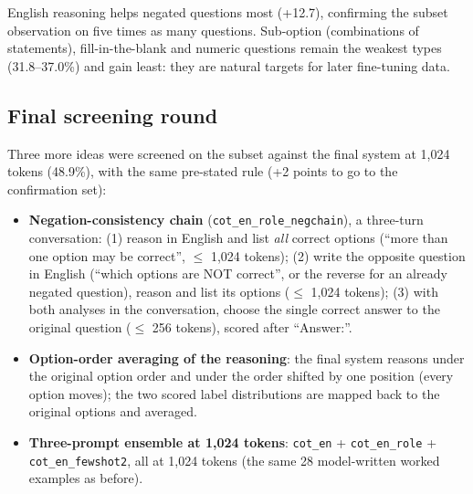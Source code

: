 \documentclass[10pt,a4paper]{article}
\newcommand{\cond}[1]{\texttt{#1}}
\begin{document}
English reasoning helps negated questions most (+12.7), confirming the subset observation on five times as many
questions. Sub-option (combinations of statements), fill-in-the-blank and numeric questions remain the weakest types
(31.8--37.0\%) and gain least: they are natural targets for later fine-tuning data.

\subsection{Final screening round}\label{sec:final_round}
Three more ideas were screened on the subset against the final system at 1,024 tokens (48.9\%), with the same
pre-stated rule (+2 points to go to the confirmation set):
\begin{itemize}
\item \textbf{Negation-consistency chain} (\cond{cot\_en\_role\_negchain}), a three-turn conversation: (1) reason in
English and list \emph{all} correct options (``more than one option may be correct'', $\le$ 1,024 tokens);
(2) write the opposite question in English (``which options are NOT correct'', or the reverse for an already negated
question), reason and list its options ($\le$ 1,024 tokens); (3) with both analyses in the conversation, choose the
single correct answer to the original question ($\le$ 256 tokens), scored after ``Answer:\textvisiblespace''.
\item \textbf{Option-order averaging of the reasoning}: the final system reasons under the original option order and
under the order shifted by one position (every option moves); the two scored label distributions are mapped back to
the original options and averaged.
\item \textbf{Three-prompt ensemble at 1,024 tokens}: \cond{cot\_en} + \cond{cot\_en\_role} + \cond{cot\_en\_fewshot2},
all at 1,024 tokens (the same 28 model-written worked examples as before).
\end{itemize}
\end{document}
